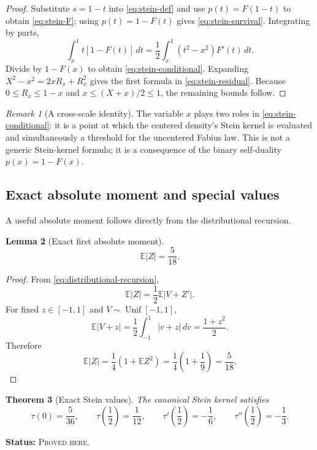\documentclass[11pt,oneside]{article}
\newtheorem{theorem}{Theorem}[section]
\newtheorem{lemma}[theorem]{Lemma}
\theoremstyle{definition}
\theoremstyle{remark}
\newtheorem{remark}[theorem]{Remark}
\newcommand{\E}{\mathbb E}
\newcommand{\ProvedHere}{\textcolor{statusgreen}{\textsc{Proved here}}}
\newcommand{\Status}[1]{\par\smallskip\noindent\textbf{Status:} #1.\par\smallskip}
\begin{document}
\begin{proof}
Substitute $s=1-t$ into \eqref{eq:stein-def} and use $p(t)=F(1-t)$ to obtain
\eqref{eq:stein-F}; using $p(t)=1-F(t)$ gives \eqref{eq:stein-survival}.
Integrating by parts,
\[
 \int_x^1t[1-F(t)]\,dt
 =\frac12\int_x^1(t^2-x^2)F'(t)\,dt.
\]
Divide by $1-F(x)$ to obtain \eqref{eq:stein-conditional}.  Expanding
$X^2-x^2=2xR_x+R_x^2$ gives the first formula in
\eqref{eq:stein-residual}.  Because $0\le R_x\le1-x$ and
$x\le(X+x)/2\le1$, the remaining bounds follow.
\end{proof}

\begin{remark}[A cross-scale identity]
The variable $x$ plays two roles in \eqref{eq:stein-conditional}: it is a point at
which the centered density's Stein kernel is evaluated and simultaneously a
threshold for the uncentered Fabius law.  This is not a generic Stein-kernel
formula; it is a consequence of the binary self-duality $p(x)=1-F(x)$.
\end{remark}

\subsection{Exact absolute moment and special values}
A useful absolute moment follows directly from the distributional recursion.

\begin{lemma}[Exact first absolute moment]\label{lem:absolute-moment}
\begin{equation}\label{eq:absolute-moment}
 \E|Z|=\frac5{18}.
\end{equation}
\end{lemma}

\begin{proof}
From \eqref{eq:distributional-recursion},
\[
 \E|Z|=\frac12\E|V+Z'|.
\]
For fixed $z\in[-1,1]$ and $V\sim\operatorname{Unif}[-1,1]$,
\[
 \E|V+z|=\frac12\int_{-1}^1|v+z|\,dv=\frac{1+z^2}{2}.
\]
Therefore
\[
 \E|Z|=\frac14(1+\E Z^2)=\frac14\left(1+\frac19\right)=\frac5{18}.
\]
\end{proof}

\begin{theorem}[Exact Stein values]\label{thm:stein-values}
The canonical Stein kernel satisfies
\begin{equation}\label{eq:stein-values}
 \tau(0)=\frac5{36},\qquad
 \tau\!\left(\frac12\right)=\frac1{12},\qquad
 \tau'\!\left(\frac12\right)=-\frac16,
 \qquad \tau''\!\left(\frac12\right)=-\frac13.
\end{equation}
\end{theorem}
\Status{\ProvedHere}
\end{document}
